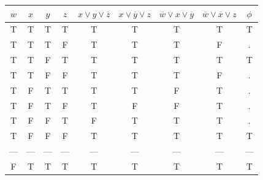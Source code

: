 \documentclass[11pt]{article}
\begin{document}
\begin{center}
  \begin{tabular}{|c|c|c|c|c|c|c|c|c|}
    \hline
    $w$ & $x$ & $y$ & $z$ & $x \vee y \vee \overline{z}$ & $x \vee \overline{y} \vee z$ & $\overline{w}  \vee x \vee \overline{y}$ & $\overline{w} \vee \overline{x} \vee z$ & $\phi$ \\
    \hline
    T   & T   & T   & T   & T                            & T                            & T                                        & T                                       & T      \\
    T   & T   & T   & F   & T                            & T                            & T                                        & F                                       & .      \\
    T   & T   & F   & T   & T                            & T                            & T                                        & T                                       & T      \\
    T   & T   & F   & F   & T                            & T                            & T                                        & F                                       & .      \\
    T   & F   & T   & T   & T                            & T                            & F                                        & T                                       & .      \\
    T   & F   & T   & F   & T                            & F                            & F                                        & T                                       & .      \\
    T   & F   & F   & T   & F                            & T                            & T                                        & T                                       & .      \\
    T   & F   & F   & F   & T                            & T                            & T                                        & T                                       & T      \\
    --- & --- & --- & --- & ---                          & ---                          & ---                                      & ---                                     & ---    \\
    F   & T   & T   & T   & T                            & T                            & T                                        & T                                       & T      \\

\end{tabular}
\end{center}
\end{document}
